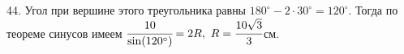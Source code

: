 44. Угол при вершине этого треугольника равны $180^\circ-2\cdot30^\circ=120^\circ.$ Тогда по теореме синусов имеем $\cfrac{10}{\sin(120^\circ)}=2R,\ R=\cfrac{10\sqrt{3}}{3}$см.\\
